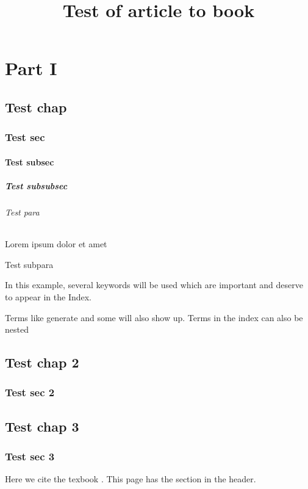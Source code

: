 \documentclass[titlepage]{exam}
\title{Test of article to book}
\begin{document}
    \frontmatter
    \maketitle
    \tableofcontents
    \listoffigures
    \listoftables
    
    \part{Part I}
    \chapter{Test chap}
    \section{Test sec}
    \subsection{Test subsec}
    \subsubsection{Test subsubsec}
    \paragraph{Test para} Lorem ipsum dolor et amet
    \subparagraph{Test subpara}
    In this example, several keywords will be used 
    which are important and deserve to appear in the Index.
    
    Terms like generate and some will also 
    show up. Terms in the index can also be nested 
    
    \chapter{Test chap 2}
    \section{Test sec 2}

    \mainmatter
    \chapter{Test chap 3}
    \section{Test sec 3}
    \clearpage
    Here we cite the texbook \cite{texbook}.
    \clearpage
    This page has the section in the header.
    
\end{document}
